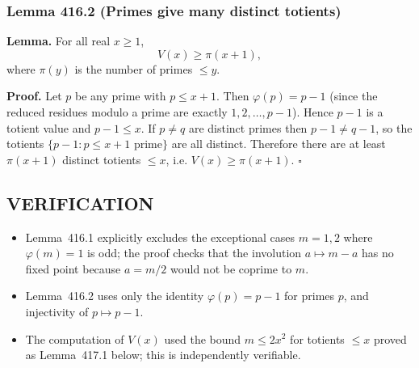 \subsubsection*{Lemma 416.2 (Primes give many distinct totients)}
\textbf{Lemma.} For all real $x\ge 1$,
\[
V(x)\ge \pi(x+1),
\]
where $\pi(y)$ is the number of primes $\le y$.

\textbf{Proof.}
Let $p$ be any prime with $p\le x+1$. Then $\varphi(p)=p-1$ (since the reduced residues modulo a prime are exactly $1,2,\dots,p-1$). Hence $p-1$ is a totient value and $p-1\le x$.
If $p\ne q$ are distinct primes then $p-1\ne q-1$, so the totients $\{p-1: p\le x+1\text{ prime}\}$ are all distinct. Therefore there are at least $\pi(x+1)$ distinct totients $\le x$, i.e. $V(x)\ge \pi(x+1)$.
\hfill$\square$

\subsection*{VERIFICATION}
\begin{itemize}
\item Lemma~416.1 explicitly excludes the exceptional cases $m=1,2$ where $\varphi(m)=1$ is odd; the proof checks that the involution $a\mapsto m-a$ has no fixed point because $a=m/2$ would not be coprime to $m$.
\item Lemma~416.2 uses only the identity $\varphi(p)=p-1$ for primes $p$, and injectivity of $p\mapsto p-1$.
\item The computation of $V(x)$ used the bound $m\le 2x^2$ for totients $\le x$ proved as Lemma~417.1 below; this is independently verifiable.
\end{itemize}

